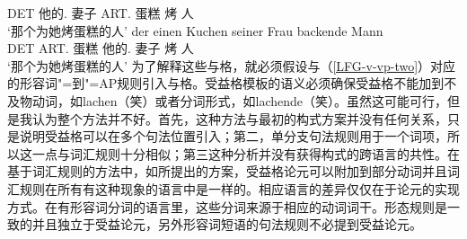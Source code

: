      DET 他的.\dat{} 妻子 ART.\acc{} 蛋糕 烤 人\\
\glt `那个为她烤蛋糕的人'
\ex
\gll der einen Kuchen seiner Frau backende Mann\\
     DET ART.\acc{} 蛋糕  他的.\dat{} 妻子 烤 人\\
\glt `那个为她烤蛋糕的人'
\zl
为了解释这些与格，就必须假设与（\ref{LFG-v-vp-two}）对应的形容词"=到"=AP规则引入与格。受益格模板的语义必须确保受益格不能加到不及物动词，如lachen（笑）或者分词形式，如lachende（笑）。虽然这可能可行，但是我认为整个方法并不好。首先，这种方法与最初的构式方案并没有任何关系，只是说明受益格可以在多个句法位置引入；第二，单分支句法规则用于一个词项，所以这一点与词汇规则十分相似；第三这种分析并没有获得构式的跨语言的共性。在基于词汇规则的方法中，如\citet[Section~5]{BC99a}所提出的方案，受益格论元可以附加到部分动词并且词汇规则在所有有这种现象的语言中是一样的。相应语言的差异仅仅在于论元的实现方式。在有形容词分词的语言里，这些分词来源于相应的动词词干。形态规则是一致的并且独立于受益论元，另外形容词短语的句法规则不必提到受益论元。

